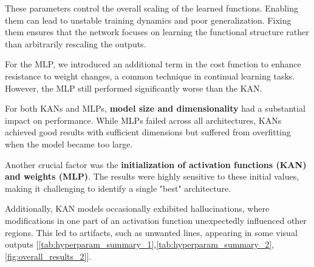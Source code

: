 \documentclass[conference]{IEEEtran}
\begin{document}
These parameters control the overall scaling of the learned functions. Enabling
them can lead to unstable training dynamics and poor generalization. Fixing
them ensures that the network focuses on learning the functional structure
rather than arbitrarily rescaling the outputs.

For the MLP, we introduced an additional term in the cost function to enhance
resistance to weight changes, a common technique in continual learning tasks.
However, the MLP still performed significantly worse than the KAN.

For both KANs and MLPs, \textbf{model size and dimensionality} had a
substantial impact on performance. While MLPs failed across all architectures,
KANs achieved good results with sufficient dimensions but suffered from
overfitting when the model became too large.

Another crucial factor was the \textbf{initialization of activation functions
    (KAN) and weights (MLP)}. The results were highly sensitive to these initial
values, making it challenging to identify a single "best" architecture.

Additionally, KAN models occasionally exhibited hallucinations, where
modifications in one part of an activation function unexpectedly influenced
other regions. This led to artifacts, such as unwanted lines, appearing in some
visual outputs
    [\ref{tab:hyperparam_summary_1},\ref{tab:hyperparam_summary_2},\ref{fig:overall_results_2}].

\begin{table}
    \centering
    \caption{Hyperparameter Tuning Summary}
    \label{tab:hyperparam_summary_1}
\end{table}
\end{document}
